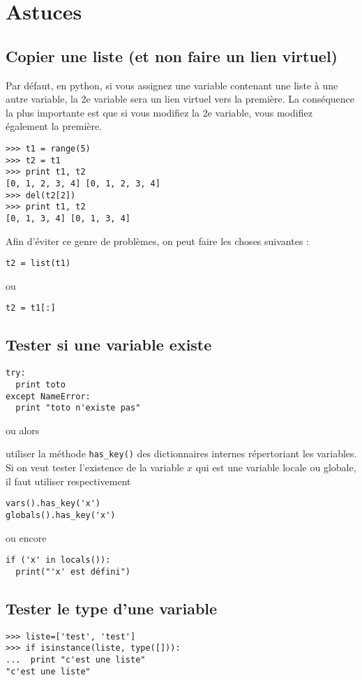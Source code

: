 \documentclass[a4paper,twoside]{article}
\begin{document}
\section{Astuces}
\subsection{Copier une liste (et non faire un lien virtuel)}
Par défaut, en python, si vous assignez une variable contenant une liste à une autre variable, la 2e variable sera un lien virtuel vers la première. La conséquence la plus importante est que si vous modifiez la 2e variable, vous modifiez également la première.

\begin{exemple}
\begin{verbatim}
>>> t1 = range(5)
>>> t2 = t1
>>> print t1, t2
[0, 1, 2, 3, 4] [0, 1, 2, 3, 4]
>>> del(t2[2])
>>> print t1, t2
[0, 1, 3, 4] [0, 1, 3, 4]
\end{verbatim}
\end{exemple}

Afin d'éviter ce genre de problèmes, on peut faire les choses suivantes :
\begin{verbatim}
t2 = list(t1)
\end{verbatim}
ou
\begin{verbatim}
t2 = t1[:]
\end{verbatim}


\subsection{Tester si une variable existe}
\begin{verbatim}
try:
  print toto
except NameError:
  print "toto n'existe pas"
\end{verbatim}

ou alors

utiliser la méthode \texttt{has\_key()} des dictionnaires internes répertoriant les variables. Si on veut tester l'existence de la variable $x$  qui est une variable locale ou globale, il faut utiliser respectivement
\begin{verbatim}
vars().has_key('x')
globals().has_key('x')
\end{verbatim}

ou encore
\begin{verbatim}
if ('x' in locals()):
  print("'x' est défini")
\end{verbatim}


\subsection{Tester le type d'une variable}
\begin{verbatim}
>>> liste=['test', 'test']
>>> if isinstance(liste, type([])):
...  print "c'est une liste"
"c'est une liste"
\end{verbatim}
\end{document}
